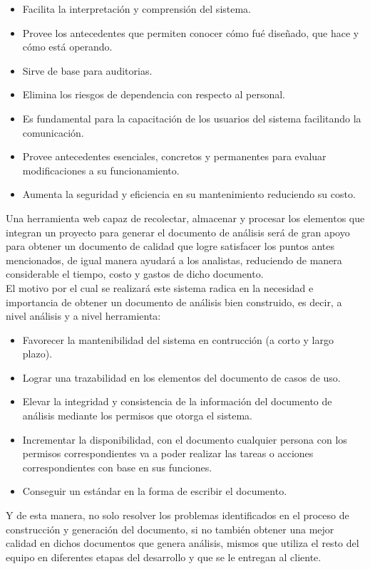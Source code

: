 \begin{itemize}
	\item Facilita la interpretación y comprensión del sistema.
	\item Provee los antecedentes que permiten conocer cómo fué diseñado, que hace y cómo está operando.
	\item Sirve de base para auditorias.
	\item Elimina los riesgos de dependencia con respecto al personal.
	\item Es fundamental para la capacitación de los usuarios del sistema facilitando la comunicación.
	\item Provee antecedentes esenciales, concretos y permanentes para evaluar modificaciones a su funcionamiento.
	\item Aumenta la seguridad y eficiencia en su mantenimiento reduciendo su costo.
\end{itemize}

Una herramienta web capaz de recolectar, almacenar y procesar los elementos que integran un proyecto para generar el documento de análisis será de gran apoyo para obtener un documento de calidad que logre satisfacer los puntos antes mencionados, de igual manera ayudará a los analistas, reduciendo de manera considerable el tiempo, costo y gastos de dicho documento.\\

El motivo por el cual se realizará este sistema radica en la necesidad e importancia de obtener un documento de análisis bien construido, es decir, a nivel análisis y a nivel herramienta:

\begin{itemize}
\item Favorecer la mantenibilidad del sistema en contrucción (a corto y largo plazo).
\item Lograr una trazabilidad en los elementos del documento de casos de uso.
\item Elevar la integridad y consistencia de la información del documento de análisis mediante los permisos que otorga el sistema.
\item Incrementar la disponibilidad, con el documento cualquier persona con los permisos correspondientes va a poder realizar las tareas o acciones  correspondientes con base en sus funciones.
\item Conseguir un estándar en la forma de escribir el documento.
\end{itemize}

Y de esta manera, no solo resolver los problemas identificados en el proceso de construcción y generación del documento, si no también obtener una mejor calidad en dichos documentos que genera análisis, mismos que utiliza el resto del equipo en diferentes etapas del desarrollo y que se le entregan al cliente.\\

